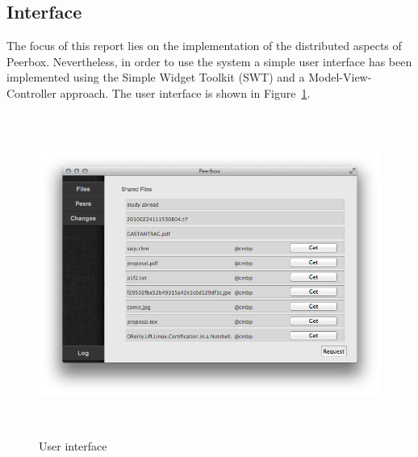 \subsection{Interface}
The focus of this report lies on the implementation of the distributed aspects of Peerbox. Nevertheless, in order to use the system a simple user interface has been implemented using the Simple Widget Toolkit (SWT) and a Model-View-Controller approach. The user interface is shown in Figure~\ref{fig:figures_gui}.
\begin{figure}[htbp]
    \centering
        \includegraphics[height=4.15in]{figures/gui.png}
    \caption{User interface}
    \label{fig:figures_gui}
\end{figure}
